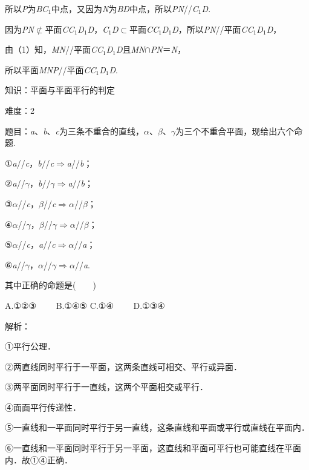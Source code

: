 \documentclass{article} %
\begin{document}
所以\textit{P}为\textit{BC}${}_{1}$中点，又因为\textit{N}为\textit{BD}中点，所以\textit{PN}//\textit{C}${}_{1}$\textit{D}.

因为\textit{PN}$\mathrm{\nsubset}$平面\textit{CC}${}_{1}$\textit{D}${}_{1}$\textit{D}，\textit{C}${}_{1}$\textit{D}$\mathrm{\subset }$平面\textit{CC}${}_{1}$\textit{D}${}_{1}$\textit{D}，所以\textit{PN}//平面\textit{CC}${}_{1}$\textit{D}${}_{1}$\textit{D}，

由（1）知，\textit{MN}//平面\textit{CC}${}_{1}$\textit{D}${}_{1}$\textit{D}且\textit{MN}$\mathrm{\cap}$\textit{PN}＝\textit{N}，

所以平面\textit{MNP}//平面\textit{CC}${}_{1}$\textit{D}${}_{1}$\textit{D}.

知识：平面与平面平行的判定

难度：2

题目：\textit{a}、\textit{b}、\textit{c}为三条不重合的直线，\textit{$\alpha$}、\textit{$\beta$}、\textit{$\gamma$}为三个不重合平面，现给出六个命题.

①\textit{a}//\textit{c}，\textit{b}//\textit{c}$\mathrm{\Rightarrow }$\textit{a}//\textit{b}；

②\textit{a}//\textit{$\gamma$}，\textit{b}//\textit{$\gamma$}$\mathrm{\Rightarrow }$\textit{a}//\textit{b}；

③\textit{$\alpha$}//\textit{c}，\textit{$\beta$}//\textit{c}$\mathrm{\Rightarrow }$\textit{$\alpha$}//\textit{$\beta$}；

④\textit{$\alpha$}//\textit{$\gamma$}，\textit{$\beta$}//\textit{$\gamma$}$\mathrm{\Rightarrow }$\textit{$\alpha$}//\textit{$\beta$}；

⑤\textit{$\alpha$}//\textit{c}，\textit{a}//\textit{c}$\mathrm{\Rightarrow }$\textit{$\alpha$}//\textit{a}；

⑥\textit{a}//\textit{$\gamma$}，\textit{$\alpha$}//\textit{$\gamma$}$\mathrm{\Rightarrow }$\textit{$\alpha$}//\textit{a}.

其中正确的命题是(　　)

A.①②③　　 B.①④⑤  C.①④　　 D.①③④

解析：

①平行公理．

②两直线同时平行于一平面，这两条直线可相交、平行或异面．

③两平面同时平行于一直线，这两个平面相交或平行．

④面面平行传递性．

⑤一直线和一平面同时平行于另一直线，这条直线和平面或平行或直线在平面内．

⑥一直线和一平面同时平行于另一平面，这直线和平面可平行也可能直线在平面内．故①④正确．
\end{document}
